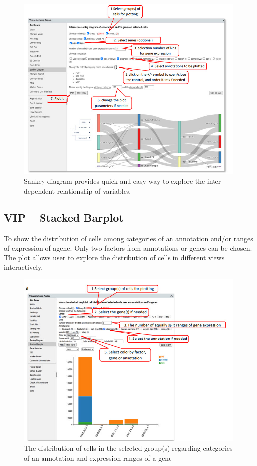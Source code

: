\documentclass[
]{article}
\begin{document}
\begin{figure}
\centering
\includegraphics{figures/F16.jpg}
\caption{Sankey diagram provides quick and easy way to explore the inter-dependent relationship of variables.}
\end{figure}

\hypertarget{vip-stacked-barplot}{%
\subsection{VIP -- Stacked Barplot}\label{vip-stacked-barplot}}

To show the distribution of cells among categories of an annotation and/or ranges of expression of agene. Only two factors from annotations or genes can be chosen. The plot allows user to explore the distribution of cells in different views interactively.

\begin{figure}
\centering
\includegraphics{figures/F17A.jpg}
\caption{The distribution of cells in the selected group(s) regarding categories of an annotation and expression ranges of a gene}
\end{figure}
\end{document}
